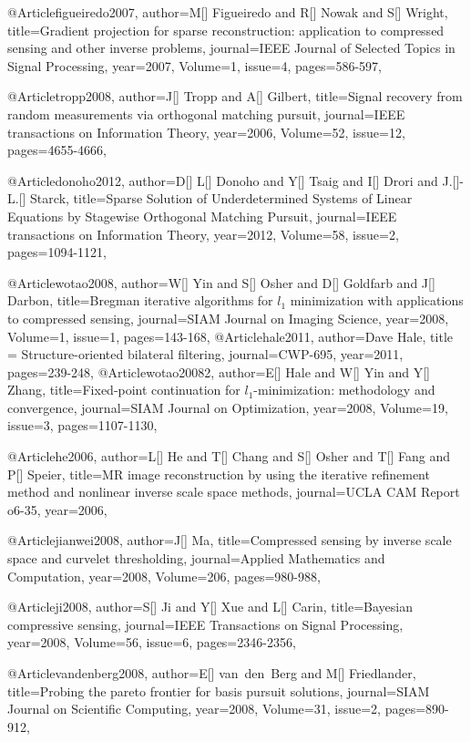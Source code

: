@Article{figueiredo2007,
  author={M[] Figueiredo and R[] Nowak and S[] Wright},
  title={Gradient projection for sparse reconstruction: application to compressed sensing and other inverse problems},
  journal={IEEE Journal of Selected Topics in Signal Processing},
  year=2007,
  Volume=1,
  issue=4,
  pages={586-597},
}


@Article{tropp2008,
  author={J[] Tropp and A[] Gilbert},
  title={Signal recovery from random measurements via orthogonal matching pursuit},
  journal={IEEE transactions on Information Theory},
  year=2006,
  Volume=52,
  issue=12,
  pages={4655-4666},
}


@Article{donoho2012,
  author={D[] L[] Donoho and Y[] Tsaig and I[] Drori and J.[]-L.[] Starck},
  title={Sparse Solution of Underdetermined Systems of Linear Equations by Stagewise Orthogonal Matching Pursuit},
  journal={IEEE transactions on Information Theory},
  year=2012,
  Volume=58,
  issue=2,
  pages={1094-1121},
}

@Article{wotao2008,
  author={W[] Yin and S[] Osher and D[] Goldfarb and J[] Darbon},
  title={Bregman iterative algorithms for $l_1$ minimization with applications to compressed sensing},
  journal={SIAM Journal on Imaging Science},
  year=2008,
  Volume=1,
  issue=1,
  pages={143-168},
}
@Article{hale2011,
  author={Dave Hale},
  title = {Structure-oriented bilateral filtering},
  journal={CWP-695},
  year=2011,
  pages={239-248},
}
@Article{wotao20082,
  author={E[] Hale and W[] Yin and Y[] Zhang},
  title={Fixed-point continuation for $l_1$-minimization: methodology and convergence},
  journal={SIAM Journal on Optimization},
  year=2008,
  Volume=19,
  issue=3,
  pages={1107-1130},
}

@Article{he2006,
  author={L[] He and T[] Chang and S[] Osher and T[] Fang and P[] Speier},
  title={MR image reconstruction by using the iterative refinement method and nonlinear inverse scale space methods},
  journal={UCLA CAM Report o6-35},
  year=2006,
}

@Article{jianwei2008,
  author={J[] Ma},
  title={Compressed sensing by inverse scale space and curvelet thresholding},
  journal={Applied Mathematics and Computation},
  year=2008,
  Volume=206,
  pages={980-988},
}

@Article{ji2008,
  author={S[] Ji and Y[] Xue and L[] Carin},
  title={Bayesian compressive sensing},
  journal={IEEE Transactions on Signal Processing},
  year=2008,
  Volume=56,
  issue=6,
  pages={2346-2356},
}

@Article{vandenberg2008,
  author={E[] van~den~Berg and M[] Friedlander},
  title={Probing the pareto frontier for basis pursuit solutions},
  journal={SIAM Journal on Scientific Computing},
  year=2008,
  Volume=31,
  issue=2,
  pages={890-912},
}

